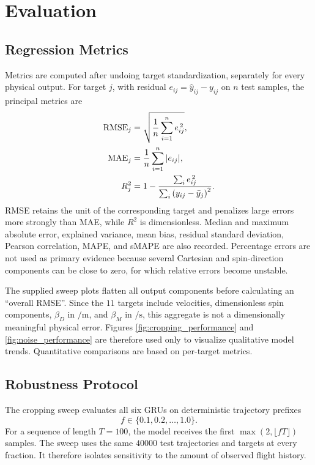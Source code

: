 \section{Evaluation}
\label{sec:evaluation}

\subsection{Regression Metrics}

Metrics are computed after undoing target standardization, separately for every physical output.
For target $j$, with residual $e_{ij}=\hat{y}_{ij}-y_{ij}$ on $n$ test samples, the principal metrics are
\begin{align}
    \operatorname{RMSE}_j
        &= \sqrt{\frac{1}{n}\sum_{i=1}^{n}e_{ij}^{\,2}}, \\
    \operatorname{MAE}_j
        &= \frac{1}{n}\sum_{i=1}^{n}\abs{e_{ij}}, \\
    R_j^2
        &= 1-\frac{\sum_i e_{ij}^{\,2}}
        {\sum_i\left(y_{ij}-\bar{y}_j\right)^2}.
\end{align}
RMSE retains the unit of the corresponding target and penalizes large errors more strongly than MAE, while $R^2$ is dimensionless. Median and maximum absolute error, explained variance, mean bias, residual standard deviation, Pearson correlation, MAPE, and sMAPE are also recorded. Percentage errors are not used as primary evidence because several Cartesian and spin-direction components can be close to zero, for which relative errors become unstable.\cite{chicco2021coefficient}

The supplied sweep plots flatten all output components before calculating an \enquote{overall RMSE}. Since the $11$ targets include velocities, dimensionless spin components, $\beta_D$ in $\si{\per\meter}$, and $\beta_M$ in $\si{\per\second}$, this aggregate is not a dimensionally meaningful physical error. Figures \ref{fig:cropping_performance} and \ref{fig:noise_performance} are therefore used only to visualize qualitative model trends. Quantitative comparisons are based on per-target metrics.

\subsection{Robustness Protocol}

The cropping sweep evaluates all six GRUs on deterministic trajectory prefixes
\begin{equation*}
    f\in\{0.1,0.2,\ldots,1.0\}.
\end{equation*}
For a sequence of length $T=100$, the model receives the first $\max(2,\lfloor fT\rfloor)$ samples. The sweep uses the same $40000$ test trajectories and targets at every fraction. It therefore isolates sensitivity to the amount of observed flight history.

